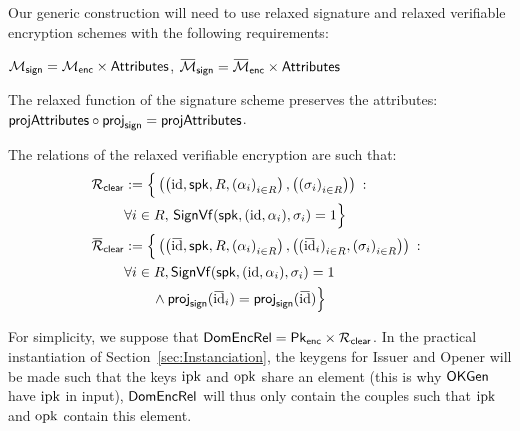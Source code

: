 \label{sec:general_AC}
Our generic construction will need to use relaxed signature and relaxed verifiable encryption schemes
with the following requirements:
\begin{compactitem}
	\item $\mathcal{M}_{\mathsf{sign}} = \mathcal{M}_{\mathsf{enc}} \times \mathsf{Attributes}$, $\SetRelMessSign = \SetRelMessEnc \times \SetAttrAC$
	\item The relaxed function of the signature scheme preserves the attributes:\newline $\proj{\SetAttrAC} \circ \projsign = \proj{\SetAttrAC}$.
	\item The relations of the relaxed verifiable encryption are such that:
		  \begin{align*}
\relationclear    & := \Big\{\left(\left(\identity, \spk, R, 
{(\alpha_i)}_{i \in R}\right),\left({(\sigma_i)}_{i \in R}\right)\right)\::\:
\hspace{0.1cm} \\ &\forall i \in R,\, \SignVf(\spk, (\identity,\alpha_i),
\signature_i) = 1 \Big\}                                                                                                                   \\ \barrelationclear & := \Big\{\left(\left(\baridentity, \spk, R, {(\alpha_i)}_{i \in R}\right),
\left({(\baridentity_i)}_{i \in R}, {(\signature_i)}_{i \in R}\right)\right)\::\:
\hspace{0.1cm} \\ &\forall i \in R, 
\SignVf(\spk, (\identity,\alpha_i), \signature_i) = 1 \\
& \hspace{7mm}\wedge \projsign(\baridentity_i) = \projsign(\baridentity) \Big\}
      \end{align*}
      \normalsize
	\item For simplicity, we suppose that  $\mathsf{DomEncRel} = \mathsf{Pk}_{\mathsf{enc}}
		\times \mathcal{R}_{\mathsf{clear}}$. In the
		practical instantiation of Section~\ref{sec:Instanciation}, the keygens for Issuer and
		Opener will be made such that the keys $\text{ipk}$ and $\text{opk}$ share an element (this is why
		 $\mathsf{OKGen}$ have $\text{ipk}$ in input),
		$\mathsf{DomEncRel}$ will thus only contain the couples such that $\text{ipk}$ and $\text{opk}$ contain this element.
\end{compactitem}

